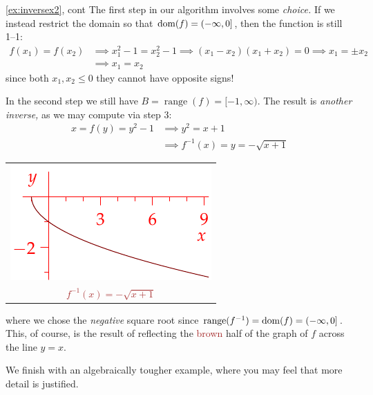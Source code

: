 \begin{example*}{\ref{ex:inversex2}, cont}{}
The first step in our algorithm involves some \emph{choice.} If we instead restrict the domain so that $\operatorname{dom}(f)=(-\infty,0]$, then the function is still 1--1:
\begin{align*}
f(x_1)=f(x_2)&\implies x_1^2-1=x_2^2-1 \implies (x_1-x_2)(x_1+x_2)=0 \implies x_1=\pm x_2\\
&\implies x_1=x_2
\end{align*}
since both $x_1,x_2\le 0$ they cannot have opposite signs!\par
\begin{minipage}[t]{0.7\linewidth}\vspace{-5pt}
In the second step we still have $B=\operatorname{range}(f)=[-1,\infty)$. The result is \emph{another inverse,} as we may compute via step 3:
\begin{align*}
x=f(y)=y^2-1&\implies y^2=x+1\\
&\implies f^{-1}(x)=y=-\sqrt{x+1}
\end{align*}
\end{minipage}\hfill\begin{minipage}[t]{0.29\linewidth}\vspace{-30pt}
\flushright\begin{tabular}{@{}c@{}}
\includegraphics{inverses-poly5}\\
\textcolor{Brown}{$f^{-1}(x)=-\sqrt{x+1}$}
\end{tabular}
\end{minipage}\medbreak
where we chose the \emph{negative} square root since $\operatorname{range}(f^{-1})=\operatorname{dom}(f)=(-\infty,0]$. This, of course, is the result of reflecting the  \textcolor{Brown}{brown} half of the graph of $f$ across the line $y=x$.
\end{example*}

\goodbreak

\fi

We finish with an algebraically tougher example, where you may feel that more detail is justified.

